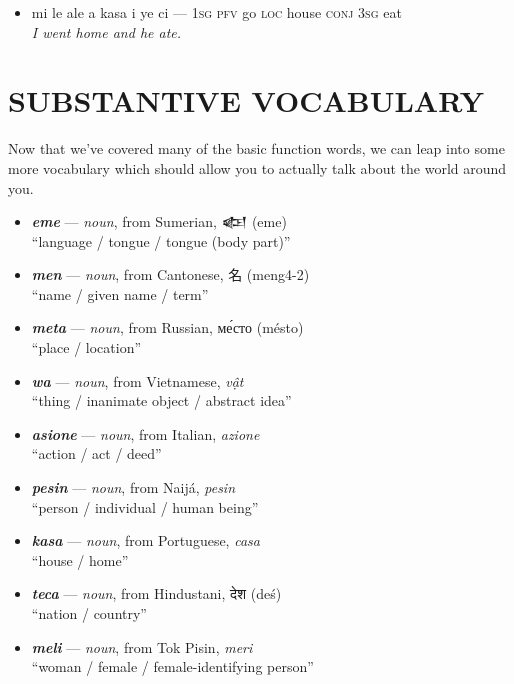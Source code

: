 \documentclass[a4paper]{article}
\begin{document}
\begin{itemize}
	\begin{itemize}
		\item mi le ale a kasa i ye ci — \textsc{1sg pfv} go \textsc{loc} house \textsc{conj 3sg} eat \\\textit{I went home and he ate.}
	\end{itemize}
\end{itemize}

\section{SUBSTANTIVE VOCABULARY}

Now that we've covered many of the basic function words, we can leap into some more vocabulary which should allow you to actually talk about the world around you.

\begin{itemize}
	\item \textbf{\textit{eme}} — \textit{noun}, from Sumerian, {\cuneiffont 𒅴} (eme) \\``language / tongue / tongue (body part)''
	\item \textbf{\textit{men}} — \textit{noun}, from Cantonese, 名 (meng4-2) \\``name / given name / term''
	\item \textbf{\textit{meta}} — \textit{noun}, from Russian, ме́сто (mésto) \\``place / location''
	\item \textbf{\textit{wa}} — \textit{noun}, from Vietnamese, \textit{vật} \\``thing / inanimate object / abstract idea''
	\item \textbf{\textit{asione}} — \textit{noun}, from Italian, \textit{azione} \\``action / act / deed''
	\item \textbf{\textit{pesin}} — \textit{noun}, from Naijá, \textit{pesin} \\``person / individual / human being''
	\item \textbf{\textit{kasa}} — \textit{noun}, from Portuguese, \textit{casa} \\``house / home''
	\item \textbf{\textit{teca}} — \textit{noun}, from Hindustani, {\hmfont देश} (deś) \\``nation / country''
	\item \textbf{\textit{meli}} — \textit{noun}, from Tok Pisin, \textit{meri} \\``woman / female / female-identifying person''

\end{itemize}
\end{document}
